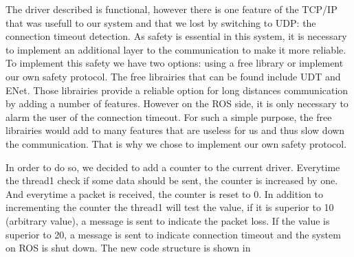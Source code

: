 The driver described is functional, however there is one feature of the TCP/IP that was usefull to our system and that we lost by switching to UDP: the connection timeout detection. As safety is essential in this system, it is necessary to implement an additional layer to the communication to make it more reliable. To implement this safety we have two options: using a free library or implement our own safety protocol. The free librairies that can be found include UDT\cite{UDT} and ENet\cite{ENet}. Those librairies provide a reliable option for long distances communication by adding a number of features. However on the ROS side, it is only necessary to alarm the user of the connection timeout. For such a simple purpose, the free librairies would add to many features that are useless for us and thus slow down the communication. That is why we chose to implement our own safety protocol.


 In order to do so, we decided to add a counter to the current driver. Everytime the thread1 check if some data should be sent, the counter is increased by one. And everytime a packet is received, the counter is reset to 0. In addition to incrementing the counter the thread1 will test the value, if it is superior to 10 (arbitrary value), a message is sent to indicate the packet loss. If the value is superior to 20, a message is sent to indicate connection timeout and the system on ROS is shut down. The new code structure is shown in ~

